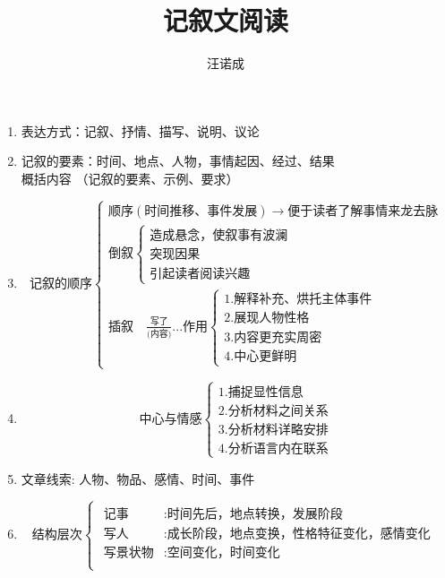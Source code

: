 \documentclass[11pt,fleqn]{article}
\title{记叙文阅读}
\author{汪诺成}
\begin{document}
\begin{enumerate}
\item 表达方式：记叙、抒情、描写、说明、议论

\item 记叙的要素：时间、地点、人物，事情起因、经过、结果 \\
  概括内容 （记叙的要素、示例、要求）

\item
  $$
  \mbox{记叙的顺序}
  \begin{cases}
    \mbox{顺序} ( \mbox{时间推移、事件发展} ) \rightarrow \mbox{便于读者了解事情来龙去脉} \\
    \mbox{倒叙} 
    \begin{cases}
      \mbox{造成悬念，使叙事有波澜} \\
      \mbox{突现因果} \\
      \mbox{引起读者阅读兴趣}
    \end{cases} \\
    \mbox{插叙} \quad \frac{\mbox{写了}}{\mbox{(内容)}} ... \mbox{作用}
    \begin{cases}
      1. \mbox{解释补充、烘托主体事件} \\
      2. \mbox{展现人物性格} \\
      3. \mbox{内容更充实周密} \\
      4. \mbox{中心更鲜明}
    \end{cases}
  \end{cases}
  $$

\item
  $$
  \mbox{中心与情感}
  \begin{cases}
    1. \mbox{捕捉显性信息} \\
    2. \mbox{分析材料之间关系} \\
    3. \mbox{分析材料详略安排} \\
    4. \mbox{分析语言内在联系}
  \end{cases}
  $$

\item 文章线索: 人物、物品、感情、时间、事件

\item
  $$
  \mbox{结构层次}
  \begin{cases}
    \begin{aligned}
      \mbox{记事}    & : \mbox{时间先后，地点转换，发展阶段} \\
      \mbox{写人}     & : \mbox{成长阶段，地点变换，性格特征变化，感情变化} \\
      \mbox{写景状物} & : \mbox{空间变化，时间变化} \\
    \end{aligned}
  \end{cases}
  $$


\end{enumerate}
\end{document}
